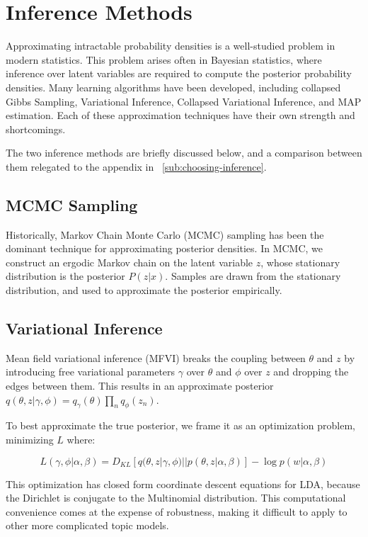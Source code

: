 \documentclass[letterpaper]{article}
\begin{document}
\section{Inference Methods}
\label{sec:inference}
Approximating intractable probability densities is a well-studied
problem in modern statistics. This problem arises often in Bayesian
statistics, where inference over latent variables are required to
compute the posterior probability densities. Many learning algorithms
have been developed, including collapsed Gibbs Sampling, Variational
Inference, Collapsed Variational Inference, and MAP estimation. Each
of these approximation techniques have their own strength and
shortcomings.

The two inference methods are briefly discussed below, and a
comparison between them relegated to the appendix in
~\autoref{sub:choosing-inference}.

\subsection{MCMC Sampling}
\label{subsec:mcmc-sampling}
Historically, Markov Chain Monte Carlo (MCMC) sampling has been the
dominant technique for approximating posterior densities. In MCMC, we
construct an ergodic Markov chain on the latent variable $z$,
whose stationary distribution is the posterior $P( z | x)$.
Samples are drawn from the stationary distribution, and used to
approximate the posterior empirically.

\subsection{Variational Inference}
\label{subsec:vi}
Mean field variational inference (MFVI) breaks the coupling between
$\theta$ and $z$ by introducing free variational parameters $\gamma$
over $\theta$ and $\phi$ over $z$ and dropping the edges between them.
This results in an approximate posterior $q(\theta, z | \gamma, \phi)
= q_\gamma(\theta)\prod_nq_\phi(z_n)$.

To best approximate the true posterior, we frame it as an optimization
problem, minimizing $L$ where:

\begin{equation}
L(\gamma, \phi | \alpha, \beta) = D_{KL}\left[ q(\theta, z | \gamma,
  \phi) || p(\theta, z | \alpha, \beta) \right] - \log p(w | \alpha, \beta)
\end{equation}

This optimization has closed form coordinate descent equations for
LDA, because the Dirichlet is conjugate to the Multinomial
distribution. This computational convenience comes at the expense of
robustness, making it difficult to apply to other more complicated
topic models.
\end{document}
